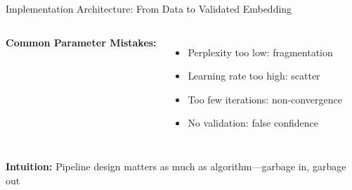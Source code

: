 \documentclass[aspectratio=169]{beamer}
\newcommand{\intuition}[1]{\colorbox{green!10}{\textcolor{intuitioncolor}{\textbf{Intuition:} #1}}}
\begin{document}
\begin{frame}{Implementation Architecture: From Data to Validated Embedding}
\begin{columns}
\textbf{Common Parameter Mistakes:}
\begin{itemize}
\item Perplexity too low: fragmentation
\item Learning rate too high: scatter
\item Too few iterations: non-convergence
\item No validation: false confidence
\end{itemize}
\end{columns}

\vspace{0.2cm}
\intuition{Pipeline design matters as much as algorithm—garbage in, garbage out}
\end{frame}

\end{document}
